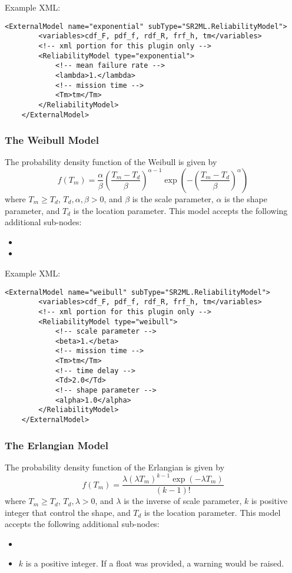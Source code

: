 Example XML:
\begin{lstlisting}[style=XML]
	<ExternalModel name="exponential" subType="SR2ML.ReliabilityModel">
		<variables>cdf_F, pdf_f, rdf_R, frf_h, tm</variables>
		<!-- xml portion for this plugin only -->
		<ReliabilityModel type="exponential">
			<!-- mean failure rate -->
			<lambda>1.</lambda>
			<!-- mission time -->
			<Tm>tm</Tm>
		</ReliabilityModel>
	</ExternalModel>
\end{lstlisting}

\subsubsection{The Weibull Model}
The probability density function of the Weibull is given by
\begin{equation}
	f(T_m) = \frac{\alpha}{\beta}\left(\frac{T_m-T_d}{\beta}\right)^{\alpha-1}\exp\left(-\left(\frac{T_m-T_d}{\beta}\right)^\alpha\right)
\end{equation}
where $T_m\geq T_d$, $T_d, \alpha, \beta >0$, and $\beta$ is the scale parameter, $\alpha$ is the shape
parameter, and $T_d$ is the location parameter.
This model accepts the following additional sub-nodes:
\begin{itemize}
	\item {}
	\item {}
\end{itemize}

Example XML:
\begin{lstlisting}[style=XML]
	<ExternalModel name="weibull" subType="SR2ML.ReliabilityModel">
		<variables>cdf_F, pdf_f, rdf_R, frf_h, tm</variables>
		<!-- xml portion for this plugin only -->
		<ReliabilityModel type="weibull">
			<!-- scale parameter -->
			<beta>1.</beta>
			<!-- mission time -->
			<Tm>tm</Tm>
			<!-- time delay -->
			<Td>2.0</Td>
			<!-- shape parameter -->
			<alpha>1.0</alpha>
		</ReliabilityModel>
	</ExternalModel>
\end{lstlisting}

\subsubsection{The Erlangian Model}
The probability density function of the Erlangian is given by
\begin{equation}
	f(T_m) = \frac{\lambda\left(\lambda T_m\right)^{k-1}\exp\left(-\lambda T_m\right)}{\left(k-1\right)!}
\end{equation}
where $T_m\geq T_d$, $T_d, \lambda >0$, and $\lambda$ is the inverse of scale parameter, $k$ is positive integer
that control the shape, and $T_d$ is the location parameter.
This model accepts the following additional sub-nodes:
\begin{itemize}
	\item {}
	\item {}
	\nb $k$ is a positive integer. If a float was provided, a warning would be raised.
\end{itemize}

